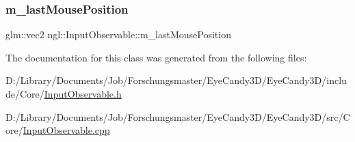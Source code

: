 \subsubsection{\texorpdfstring{m\+\_\+last\+Mouse\+Position}{m\_lastMousePosition}}
{\footnotesize\ttfamily glm\+::vec2 ngl\+::\+Input\+Observable\+::m\+\_\+last\+Mouse\+Position\hspace{0.3cm}{\ttfamily [protected]}}



The documentation for this class was generated from the following files\+:\begin{DoxyCompactItemize}
\item 
D\+:/\+Library/\+Documents/\+Job/\+Forschungsmaster/\+Eye\+Candy3\+D/\+Eye\+Candy3\+D/include/\+Core/\mbox{\hyperlink{_input_observable_8h}{Input\+Observable.\+h}}\item 
D\+:/\+Library/\+Documents/\+Job/\+Forschungsmaster/\+Eye\+Candy3\+D/\+Eye\+Candy3\+D/src/\+Core/\mbox{\hyperlink{_input_observable_8cpp}{Input\+Observable.\+cpp}}\end{DoxyCompactItemize}
